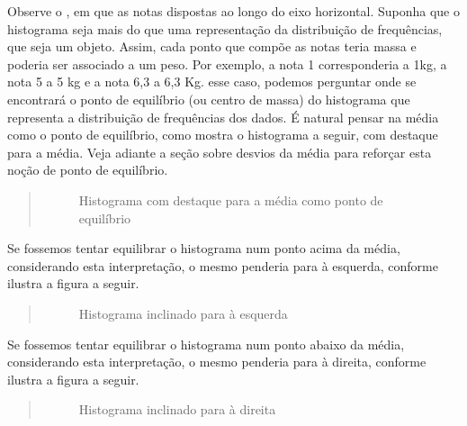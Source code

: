 Observe o {\hyperref[\detokenize{PE104-0:fig-histograma-notas-sem-bonificacao}]{}} , em que as notas dispostas ao longo do eixo horizontal. Suponha que o histograma seja mais do que uma representação da distribuição de frequências, que seja um objeto. Assim, cada ponto que compõe as notas teria massa e poderia ser associado a um peso.  Por exemplo, a nota 1 corresponderia a 1kg, a nota 5 a 5 kg e a nota 6,3 a 6,3 Kg.  esse caso, podemos perguntar onde se encontrará o ponto de equilíbrio (ou centro de massa) do histograma que representa a distribuição de frequências dos dados. É natural pensar na média como o ponto de equilíbrio, como mostra o histograma a seguir, com destaque para a média. Veja adiante a seção sobre desvios da média para reforçar esta noção de ponto de equilíbrio.
\label{\detokenize{PE104-1:id1}}\begin{quote}

\begin{figure}[H]
\centering
\capstart

\noindent{}
\caption{Histograma com destaque para a média como ponto de equilíbrio}\label{\detokenize{PE104-1:id8}}\end{figure}
\end{quote}

Se fossemos tentar equilibrar o histograma num ponto acima da média, considerando esta interpretação, o mesmo penderia para à esquerda, conforme ilustra a figura a seguir.
\begin{quote}

\begin{figure}[H]
\centering
\capstart

\noindent{}
\caption{Histograma inclinado para à esquerda}\label{\detokenize{PE104-1:id2}}\label{\detokenize{PE104-1:id9}}\end{figure}
\end{quote}

Se fossemos tentar equilibrar o histograma num ponto abaixo da média, considerando esta interpretação, o mesmo penderia para à direita, conforme ilustra a figura a seguir.
\begin{quote}

\begin{figure}[H]
\centering
\capstart

\noindent{}
\caption{Histograma inclinado para à direita}\label{\detokenize{PE104-1:id3}}\label{\detokenize{PE104-1:id10}}\end{figure}
\end{quote}


